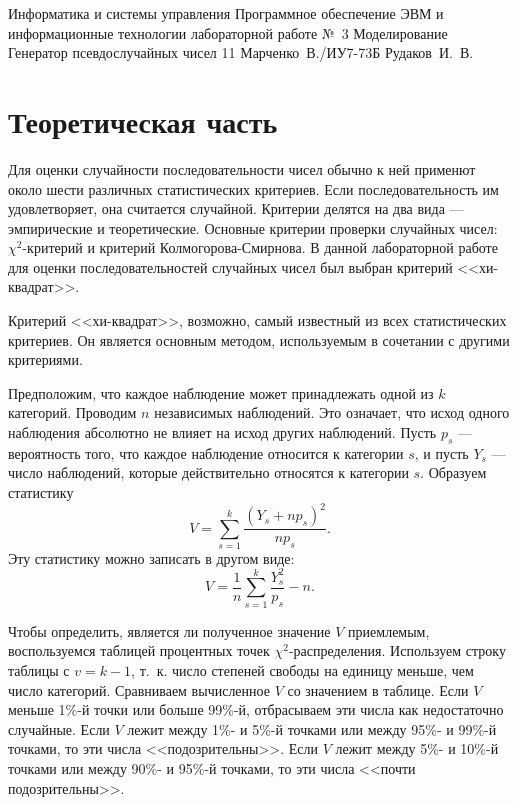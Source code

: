 \documentclass{bmstu}
\begin{document}
\makereporttitle
    {Информатика и системы управления}
    {Программное обеспечение ЭВМ и информационные технологии}
    {лабораторной работе №~3} %
    {Моделирование} %
    {Генератор псевдослучайных чисел} %
    {11} %
    {Марченко~В./ИУ7-73Б} %
    {Рудаков~И.~В.} %

{\centering \maketableofcontents}

\chapter{Теоретическая часть}

Для оценки случайности последовательности чисел обычно к ней применют около шести различных статистических критериев. 
Если последовательность им удовлетворяет, она считается случайной. 
Критерии делятся на два вида --- эмпирические и теоретические. 
Основные критерии проверки случайных чисел: $\chi^2$-критерий и критерий Колмогорова-Смирнова. 
В данной лабораторной работе для оценки последовательностей случайных чисел был выбран критерий <<хи-квадрат>>.

Критерий <<хи-квадрат>>, возможно, самый известный из всех статистических критериев. 
Он является основным методом, используемым в сочетании с другими критериями.

Предположим, что каждое наблюдение может принадлежать одной из $k$ категорий. 
Проводим $n$ независимых наблюдений. 
Это означает, что исход одного наблюдения абсолютно не влияет на исход других наблюдений. 
Пусть $p_s$ --- вероятность того, что каждое наблюдение относится к категории $s$, и пусть $Y_s$ --- число наблюдений, которые действительно относятся к категории $s$. 
Образуем статистику
\begin{equation}
	V = \sum_{s = 1}^{k} \frac{(Y_s + np_s)^2}{np_s}.
\end{equation}
Эту статистику можно записать в другом виде:
\begin{equation}
	V = \frac{1}{n} \sum_{s = 1}^{k} \frac{Y^2_s}{p_s} - n.
\end{equation}

Чтобы определить, является ли полученное значение $V$ приемлемым, воспользуемся таблицей процентных точек $\chi^2$-распределения. 
Используем строку таблицы с $v = k - 1$, т.~к. число степеней свободы на единицу меньше, чем число категорий. 
Сравниваем вычисленное $V$ со значением в таблице. 
Если $V$ меньше 1\%-й точки или больше 99\%-й, отбрасываем эти числа как недостаточно случайные. 
Если $V$ лежит между 1\%- и 5\%-й точками или между 95\%- и 99\%-й точками, то эти числа <<подозрительны>>. 
Если $V$ лежит между 5\%- и 10\%-й точками или между 90\%- и 95\%-й точками, то эти числа <<почти подозрительны>>.
\end{document}
